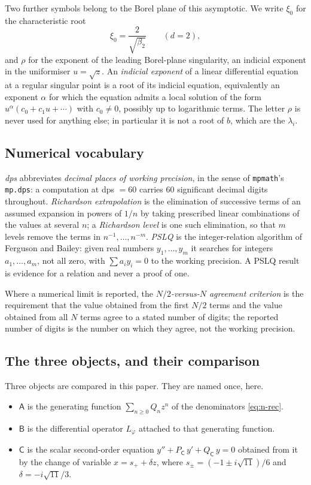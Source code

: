 Two further symbols belong to the Borel plane of this asymptotic. We write
$\xi_0$ for the characteristic root
\[
  \xi_0=\frac{2}{\sqrt{\beta_2}}\qquad(d=2),
\]
and $\rho$ for the exponent of the leading Borel-plane singularity, an indicial
exponent in the uniformiser $u=\sqrt z$. An \emph{indicial exponent} of a
linear differential equation at a regular singular point is a root of its
indicial equation, equivalently an exponent $\alpha$ for which the equation
admits a local solution of the form $u^{\alpha}(c_0+c_1u+\cdots)$ with
$c_0\neq0$, possibly up to logarithmic terms. The letter $\rho$ is never used
for anything else; in particular it is not a root of $b$, which are the
$\lambda_i$.

\subsection{Numerical vocabulary}\label{ssec:numerics}

\emph{dps} abbreviates \emph{decimal places of working precision}, in the sense
of \texttt{mpmath}'s \texttt{mp.dps}: a computation at dps $=60$ carries $60$
significant decimal digits throughout. \emph{Richardson extrapolation} is the
elimination of successive terms of an assumed expansion in powers of $1/n$ by
taking prescribed linear combinations of the values at several $n$; a
\emph{Richardson level} is one such elimination, so that $m$ levels remove the
terms in $n^{-1},\dots,n^{-m}$. \emph{PSLQ} is the integer-relation algorithm
of Ferguson and Bailey: given real numbers $y_1,\dots,y_m$ it searches for
integers $a_1,\dots,a_m$, not all zero, with $\sum a_i y_i=0$ to the working
precision. A PSLQ result is evidence for a relation and never a proof of one.

Where a numerical limit is reported, the \emph{$N/2$-versus-$N$ agreement
criterion} is the requirement that the value obtained from the first $N/2$
terms and the value obtained from all $N$ terms agree to a stated number of
digits; the reported number of digits is the number on which they agree, not
the working precision.

\subsection{The three objects, and their comparison}\label{ssec:objects}

Three objects are compared in this paper. They are named once, here.

\begin{itemize}
\item \textbf{$\mathsf A$} is the generating function $\sum_{n\ge0}Q_nz^n$ of
  the denominators \eqref{eq:n-rec}.
\item \textbf{$\mathsf B$} is the differential operator $L_\varphi$ attached to
  that generating function.
\item \textbf{$\mathsf C$} is the scalar second-order equation
  $y''+P_{\mathsf C}\,y'+Q_{\mathsf C}\,y=0$ obtained from it by the change of
  variable $x=s_++\delta z$, where $s_\pm=(-1\pm i\sqrt{11})/6$ and
  $\delta=-i\sqrt{11}/3$.
\end{itemize}

